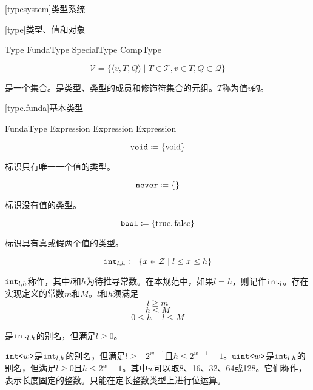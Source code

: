 
[typesystem]{类型系统}

[type]{类型、值和对象}

\begin{bnf}{Type}
    FundaType \br
    SpecialType \br
    CompType
\end{bnf}

$$ \mathcal{V} = \{ \langle v, T, Q \rangle \mid T \in \mathcal{T}, v \in T, Q \subset \mathcal{Q} \} $$

\pnum
{}是一个集合。是类型、类型的成员和修饰符集合的元组。$T$称为值$v$的。

[type.funda]{基本类型}

\begin{bnf}{FundaType}
     \br
     \br
     \br
     \br
     \br
     \terminal{<} Expression \terminal{>} \br
     \terminal{<} Expression \terminal{>} \br
     \br
     \terminal{<} Expression \terminal{>}
\end{bnf}

$$\texttt{void} \coloneqq \{ \mathrm{void} \}$$

\pnum
{}标识只有唯一一个值的类型。

$$\texttt{never} \coloneqq \{ \}$$

\pnum
{}标识没有值的类型。

$$\texttt{bool} \coloneqq \{ \mathrm{true}, \mathrm{false} \}$$

\pnum
{}标识具有真或假两个值的类型。

$$\texttt{int}_{l,h} \coloneqq \{ x \in \mathcal{Z} \mid l \le x \le h \} $$

\pnum
$\texttt{int}_{l,h}$称作，其中$l$和$h$为待推导常数。在本规范中，如果$l = h$，则记作$\texttt{int}_l$。存在实现定义的常数$m$和$M$。$l$和$h$须满足
$$ l \ge m $$
$$ h \le M $$
$$ 0 \le h - l \le M $$

是$\texttt{int}_{l,h}$的别名，但满足$l\ge0$。

\pnum
$\texttt{int<}w\texttt{>}$是$\texttt{int}_{l,h}$的别名，但满足$l\ge-2^{w-1}$且$h\le2^{w-1}-1$。$\texttt{uint<}w\texttt{>}$是$\texttt{int}_{l,h}$的别名，但满足$l\ge0$且$h\le2^w-1$。其中$w$可以取8、16、32、64或128。它们称作，表示长度固定的整数。只能在定长整数类型上进行位运算。

